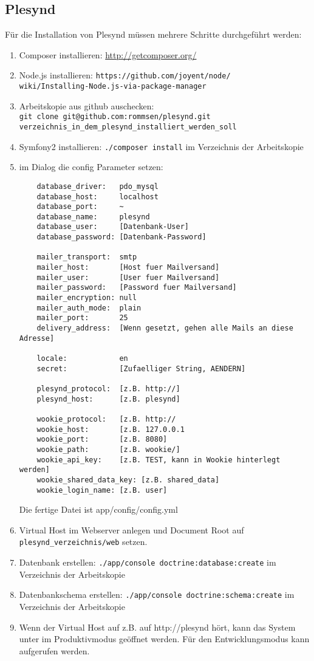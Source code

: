 \subsection*{Plesynd}
Für die Installation von Plesynd müssen mehrere Schritte durchgeführt werden:
\begin{enumerate}
 \item Composer installieren: \url{http://getcomposer.org/}
 \item Node.js installieren: \texttt{https://github.com/joyent/node/}\\
 \texttt{wiki/Installing-Node.js-via-package-manager}
 \item Arbeitskopie aus github auschecken:\\ \texttt{git clone git@github.com:rommsen/plesynd.git}\\
 \texttt{verzeichnis\_in\_dem\_plesynd\_installiert\_werden\_soll}
 \item Symfony2 installieren: \texttt{./composer install} im Verzeichnis der Arbeitskopie
 \item im Dialog die config Parameter setzen:
 \begin{lstlisting}
    database_driver:   pdo_mysql
    database_host:     localhost
    database_port:     ~
    database_name:     plesynd
    database_user:     [Datenbank-User]
    database_password: [Datenbank-Password]

    mailer_transport:  smtp
    mailer_host:       [Host fuer Mailversand]
    mailer_user:       [User fuer Mailversand]
    mailer_password:   [Password fuer Mailversand]
    mailer_encryption: null
    mailer_auth_mode:  plain
    mailer_port:       25
    delivery_address:  [Wenn gesetzt, gehen alle Mails an diese Adresse]

    locale:            en
    secret:            [Zufaelliger String, AENDERN]

    plesynd_protocol:  [z.B. http://] 
    plesynd_host:      [z.B. plesynd]

    wookie_protocol:   [z.B. http://
    wookie_host:       [z.B. 127.0.0.1
    wookie_port:       [z.B. 8080]
    wookie_path:       [z.B. wookie/]
    wookie_api_key:    [z.B. TEST, kann in Wookie hinterlegt werden]
    wookie_shared_data_key: [z.B. shared_data]
    wookie_login_name: [z.B. user]
 \end{lstlisting}
 Die fertige Datei ist app/config/config.yml
 \item Virtual Host im Webserver anlegen und Document Root auf \\
 \texttt{plesynd\_verzeichnis/web} setzen.
 \item Datenbank erstellen: \texttt{./app/console doctrine:database:create} im Verzeichnis der Arbeitskopie
 \item Datenbankschema erstellen: \texttt{./app/console doctrine:schema:create} im Verzeichnis der Arbeitskopie
 \item Wenn der Virtual Host auf z.B. auf http://plesynd hört, kann das System unter  im Produktivmodus geöffnet werden. Für den Entwicklungsmodus kann  aufgerufen werden.   
\end{enumerate}

